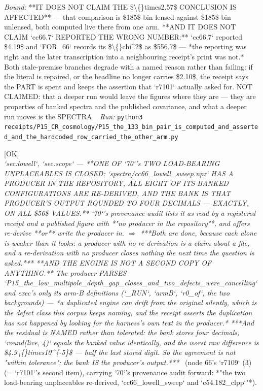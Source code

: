 \begin{description}
 \emph{Bound:}  **IT DOES NOT CLAIM THE \$\textbackslash\{\}times2.57\$ CONCLUSION IS AFFECTED** --- that comparison is \$185\$-bin lensed against \$185\$-bin unlensed, both computed live there from one arm. **AND IT DOES NOT CLAIM `cc66.7` REPORTED THE WRONG NUMBER:** `cc66.7` reported \$4.19\$ and `FOR\_66` records its \$\textbackslash\{\}chi\textasciicircum{}2\$ as \$556.7\$ --- *the reporting was right and the later transcription into a neighbouring receipt's print was not.*  Both stale-premise branches degrade with a named reason rather than failing: if the literal is repaired, or the headline no longer carries \$2.10\$, the receipt says the PART is spent and keeps the assertion that `r7101` actually asked for. NOT CLAIMED: that a deeper run would leave the figures where they are --- they are properties of banked spectra and the published covariance, and what a deeper run moves is the SPECTRA.
\ \emph{Run:} \texttt{python3 receipts/P15\_CR\_cosmology/P15\_the\_133\_bin\_pair\_is\_computed\_and\_asserted\_and\_the\_hardcoded\_row\_carried\_the\_other\_arm.py}
\item[\rcptlabel{P15_the_lowell_sweep_is_reproduced_by_a_producer_in_the_repository_and_the_bank_is_that_producers_output_rounded}{P15R237}\textbf{P15R237}\quad\texttt{P15\_the\_lowell\_sweep\_is\_reproduced\_by\_a\_producer\_in\_the\_repository\_and\_the\_bank\_is\_that\_producers\_output\_rounded}]\hfill\textsf{[OK]}\\
\textit{`sec:lowell`, `sec:scope` ---  **ONE OF `70`'s TWO LOAD-BEARING UNPLACEABLES IS CLOSED: `spectra/cc66\_lowell\_sweep.npz` HAS A PRODUCER IN THE REPOSITORY, ALL EIGHT OF ITS BANKED CONFIGURATIONS ARE RE-DERIVED, AND THE BANK IS THAT PRODUCER'S OUTPUT ROUNDED TO FOUR DECIMALS --- EXACTLY, ON ALL \$56\$ VALUES.** `70`'s provenance audit lists it as read by a registered receipt and a published figure with *"no producer in the repository"*, and offers re-derive **or** write the producer in. \ensuremath{\Rightarrow} ***Both are done, because each alone is weaker than it looks: a producer with no re-derivation is a claim about a file, and a re-derivation with no producer closes nothing the next time the question is asked.***  **AND THE ENGINE IS NOT A SECOND COPY OF ANYTHING.** The producer PARSES `P15\_the\_low\_multipole\_depth\_gap\_closes\_and\_two\_defects\_were\_cancelling` and exec's only its arm-B definitions (`\_RUN`, `armB`, `r0\_of`, the two backgrounds) --- *a duplicated engine can drift from the original silently, which is the defect class this corpus keeps naming, and the receipt asserts the duplication has not happened by looking for the harness's own text in the producer.*  ***And the residual is NAMED rather than tolerated: the bank stores four decimals, `round(live, 4)` equals the banked value identically, and the worst raw difference is \$4.9\textbackslash\{\}times10\textasciicircum{}\{-5\}\$ --- half the last stored digit. So the agreement is not "within tolerance"; the bank IS the producer's output.***} \ (node 66's `r7109` (3) (= `r7101`'s second item), carrying `70`'s provenance audit forward: *"the two load-bearing unplaceables re-derived, `cc66\_lowell\_sweep` and `c54.182\_clpp`"*). 

\end{description}
